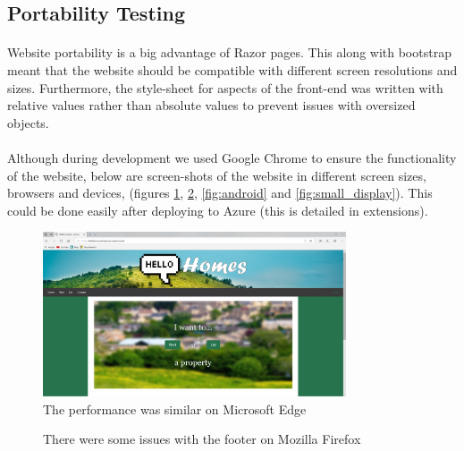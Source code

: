 \documentclass{article}
\begin{document}
    \subsection{Portability Testing}
        \paragraph{}
            Website portability is a big advantage of Razor pages. This along with bootstrap meant that the website should be compatible with different screen resolutions and sizes. Furthermore, the style-sheet for aspects of the front-end was written with relative values rather than absolute values to prevent issues with oversized objects.

        \paragraph{}
            Although during development we used Google Chrome to ensure the functionality of the website, below are screen-shots of the website in different screen sizes, browsers and devices, (figures \ref{fig:edge}, \ref{fig:firefox}, \ref{fig:android} and \ref{fig:small_display}). This could be done easily after deploying to Azure (this is detailed in extensions).

            \begin{figure}[!htb]
                \centering
                \includegraphics[width=0.8\textwidth]{figures/edge.png}
                \caption[Edge Scaling]{The performance was similar on Microsoft Edge}
                \label{fig:edge}
            \end{figure}

            \begin{figure}[!htb]
                \centering
                \caption[Firefox Scaling]{There were some issues with the footer on Mozilla Firefox}
                \label{fig:firefox}
            \end{figure}
\end{document}
